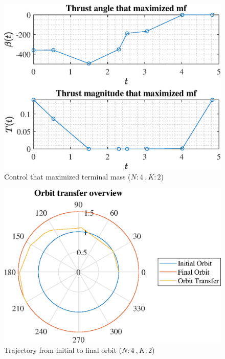 \documentclass[]{article}
\begin{document}
	\begin{figure}
		\centering
		\includegraphics[scale=0.75]{control_N4_K2_C2_mf.eps}
		\caption{Control that maximized terminal mass (\(N:4\ , K:2\))}
		\label{fig:control_N4_K2_C2_mf}
	\end{figure}
	\begin{figure}
		\centering
		\includegraphics[scale=0.75]{orbit_N4_K2_C2_mf.eps}
		\caption{Trajectory from initial to final orbit (\(N:4\ , K:2\))}
		\label{fig:orbit_N4_K2_C2_mf}
	\end{figure}
\end{document}

